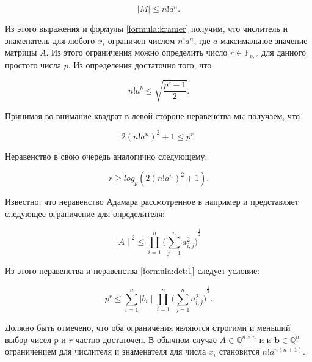 \documentclass[master, och, diploma, times]{sty/SCWorks}
\theoremstyle{plain}
\theoremstyle{definition}
\begin{document}
\begin{equation}
\mid M \mid \leq n!a^n.
\end{equation}

\noindent Из этого выражения и формулы \ref{formula:kramer} получим, что числитель и знаменатель для любого $x_i$ ограничен числом $n!a^n$, где $a$ максимальное значение матрицы $A$. Из этого ограничения можно определить число $r \in \mathbb{F}_{p,r}$ для данного простого числа $p$. Из определения достаточно того, что

\begin{equation}\label{formula:det:1}
n!a^b \leq \sqrt{\frac{p^r-1}{2}}.
\end{equation}

Принимая во внимание квадрат в левой стороне неравенства мы получаем, что 

\begin{equation}
2{(n!a^n)}^2+1\leq p^r.
\end{equation}

Неравенство в свою очередь аналогично следующему:

\begin{equation}
r \geq log_p(2{(n!a^n)}^2+1).
\end{equation}




Известно, что неравенство Адамара рассмотренное в например \cite{bib:numbers:mignotte} и \cite{bib:numbers:marcus} представляет следующее ограничение для определителя:

\begin{equation}
{\mid A \mid}^2 \leq \prod\limits_{i=1}^{n}{\bigg(\sum\limits_{j=1}^{n} a^2_{i,j} \bigg)}^{\frac{1}{2}}
\end{equation}

Из этого неравенства и неравенства \ref{formula:det:1} следует условие:

\begin{equation}
p^r \leq \sum\limits_{i=1}^{n} {\mid b_i \mid} \prod\limits_{i=1}^{n}{\bigg(\sum\limits_{j=1}^{n} a^2_{i,j} \bigg)}^{\frac{1}{2}}.
\end{equation}

Должно быть отмечено, что оба ограничения являются строгими и меньший выбор чисел $p$ и $r$ частно достаточен. В обычном случае $A \in \mathbb{Q}^{n \times n}$ и и $\boldsymbol{b} \in \mathbb{Q}^{n}$ ограничением для числителя и знаменателя для числа $x_i$ становится $n!a^{n(n+1)}$. 
\end{document}
